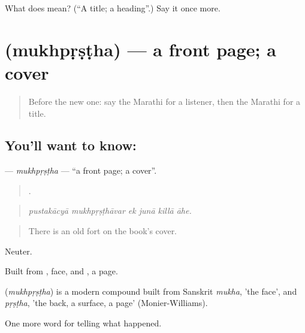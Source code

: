 \begin{tcolorbox}[breakable,colback=teal!4,colframe=teal!35!black,title={Before you move on}]
What does  mean? (\textquotedblleft{}A title; a heading\textquotedblright{}.) Say it once more.
\end{tcolorbox}
\section[\texorpdfstring{\mr{मुखपृष्ठ} (mukhpṛṣṭha)}{मुखपृष्ठ (mukhpṛṣṭha)}]{ (mukhpṛṣṭha) — a front page; a cover}

\label{lesson:MR-C314-mukhprstha}



\begin{quote}
Before the new one: say the Marathi for a listener, then the Marathi for a title.
\end{quote}

\subsection*{You'll want to know: }
\textbf{} — \emph{mukhpṛṣṭha} — \textquotedblleft{}a front page; a cover\textquotedblright{}.

\begin{quote}
     .
\end{quote}

\begin{quote}
\emph{pustakācyā mukhpṛṣṭhāvar ek junā killā āhe.}
\end{quote}

\begin{quote}
There is an old fort on the book's cover.
\end{quote}

Neuter.

Built from , face, and , a page.

\begin{cousinweb}
\textbf{} (\emph{mukhpṛṣṭha}) is a modern compound built from Sanskrit \emph{mukha}, 'the face', and \emph{pṛṣṭha}, 'the back, a surface, a page' (Monier-Williams).
\end{cousinweb}

\begin{grammarlens}[title={What you've built}]
One more word for telling what happened.
\end{grammarlens}

